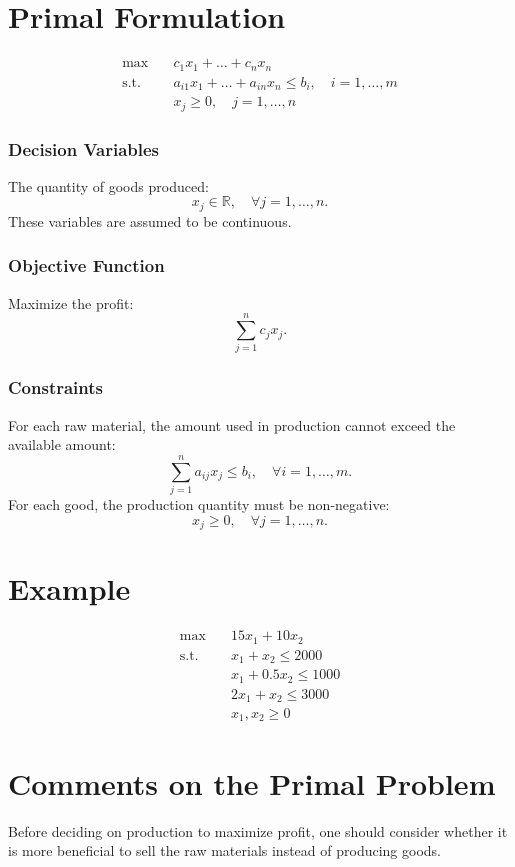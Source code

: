 \documentclass[a4paper, 11pt]{article}
\begin{document}
\section{Primal Formulation}

\begin{align*}
\max & \quad c_{1}x_{1} + \dots + c_{n}x_{n} \\
\text{s.t.} & \quad a_{i1}x_{1} + \dots + a_{in}x_{n} \leq b_{i}, \quad i=1, \dots, m \\
& \quad x_{j} \geq 0, \quad j=1, \dots, n
\end{align*}

\subsubsection*{Decision Variables}
The quantity of goods produced:
\[ x_{j} \in \mathbb{R}, \quad \forall j=1,\dots,n. \]
These variables are assumed to be continuous.

\subsubsection*{Objective Function}
Maximize the profit:
\[ \sum_{j=1}^{n} c_{j}x_{j}. \]

\subsubsection*{Constraints}
For each raw material, the amount used in production cannot exceed the available amount:
\[ \sum_{j=1}^{n} a_{ij} x_{j} \leq b_{i}, \quad \forall i=1,\dots,m. \]
For each good, the production quantity must be non-negative:
\[ x_{j} \geq 0, \quad \forall j=1,\dots,n. \]

\section{Example}

\begin{align*}
\max & \quad 15x_{1} + 10x_{2} \\
\text{s.t.} & \quad x_{1} + x_{2} \leq 2000 \\
& \quad x_{1} + 0.5x_{2} \leq 1000 \\
& \quad 2x_{1} + x_{2} \leq 3000 \\
& \quad x_{1}, x_{2} \geq 0
\end{align*}

\section{Comments on the Primal Problem}
Before deciding on production to maximize profit, one should consider whether it is more beneficial to sell the raw materials instead of producing goods.
\end{document}

